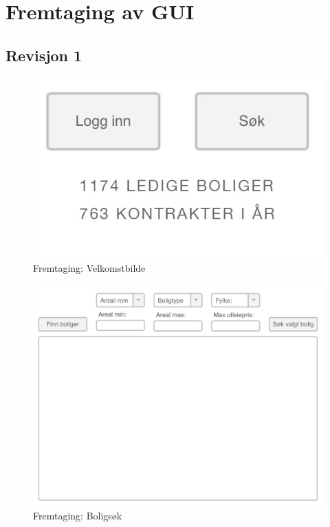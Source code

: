 \chapter{Fremtaging av GUI}

\section{Revisjon 1}

\begin{figure}[ht]
\center
 \includegraphics[scale=0.5]{./img/appendix/gui_forslag/rev_1/Velkomstbilde.jpg}
 \caption{Fremtaging: Velkomstbilde}
 \label{fig:DEV:velkomstbilde}
\end{figure}

\begin{figure}[ht]
\center
 \includegraphics[scale=0.5]{./img/appendix/gui_forslag/rev_1/Boligsok.png}
 \caption{Fremtaging: Boligsøk}
 \label{fig:DEV:boligsok}
\end{figure}

